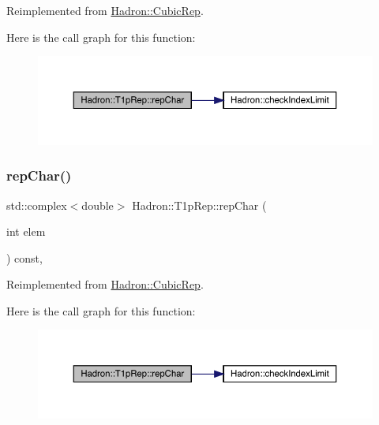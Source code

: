Reimplemented from \mbox{\hyperlink{structHadron_1_1CubicRep_af45227106e8e715e84b0af69cd3b36f8}{Hadron\+::\+Cubic\+Rep}}.

Here is the call graph for this function\+:
\nopagebreak
\begin{figure}[H]
\begin{center}
\leavevmode
\includegraphics[width=350pt]{df/dba/structHadron_1_1T1pRep_ad5fd4bf6eaa8fd1a465bd6757d7b4379_cgraph}
\end{center}
\end{figure}
\mbox{\label{structHadron_1_1T1pRep_ad5fd4bf6eaa8fd1a465bd6757d7b4379}} 
\subsubsection{\texorpdfstring{repChar()}{repChar()}\hspace{0.1cm}{\footnotesize\ttfamily [3/3]}}
{\footnotesize\ttfamily std\+::complex$<$double$>$ Hadron\+::\+T1p\+Rep\+::rep\+Char (\begin{DoxyParamCaption}\item[{int}]{elem }\end{DoxyParamCaption}) const\hspace{0.3cm}{\ttfamily [inline]}, {\ttfamily [virtual]}}



Reimplemented from \mbox{\hyperlink{structHadron_1_1CubicRep_af45227106e8e715e84b0af69cd3b36f8}{Hadron\+::\+Cubic\+Rep}}.

Here is the call graph for this function\+:
\nopagebreak
\begin{figure}[H]
\begin{center}
\leavevmode
\includegraphics[width=350pt]{df/dba/structHadron_1_1T1pRep_ad5fd4bf6eaa8fd1a465bd6757d7b4379_cgraph}
\end{center}
\end{figure}
\mbox{\label{structHadron_1_1T1pRep_ad013f454206c3e9f9b7c78db7812df97}} 

